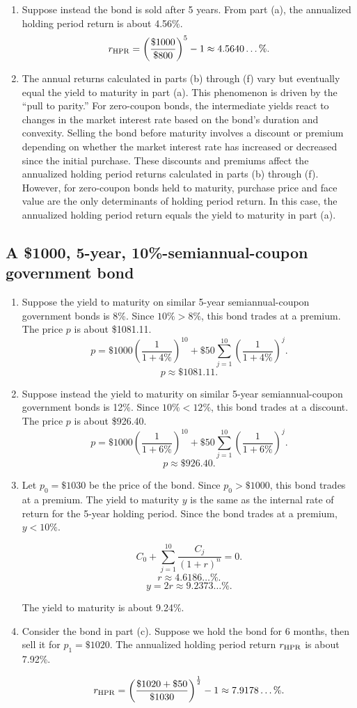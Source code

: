\documentclass[12pt]{article}
\begin{document}
\begin{enumerate}
\item Suppose instead the bond is sold after 5 years. From part (a), the annualized holding period return is about 4.56\%. \[r_{\rm HPR}=\left(\frac{\$1000}{\$800}\right)^5-1\approx 4.5640\dots\%.\]
\item The annual returns calculated in parts (b) through (f) vary but eventually equal the yield to maturity in part (a). This phenomenon is driven by the ``pull to parity.'' For zero-coupon bonds, the intermediate yields react to changes in the market interest rate based on the bond's duration and convexity. Selling the bond before maturity involves a discount or premium depending on whether the market interest rate has increased or decreased since the initial purchase. These discounts and premiums affect the annualized holding period returns calculated in parts (b) through (f). However, for zero-coupon bonds held to maturity, purchase price and face value are the only determinants of holding period return. In this case, the annualized holding period return equals the yield to maturity in part (a).
\end{enumerate}
\subsection{A \$1000, 5-year, 10\%-semiannual-coupon government bond}
\begin{enumerate}
\item Suppose the yield to maturity on similar 5-year semiannual-coupon government bonds is 8\%. Since $10\%>8\%$, this bond trades at a premium. The  price $p$ is about \$1081.11. \[p=\$1000\left(\frac{1}{1+4\%}\right)^{10}+\$50\sum_{j=1}^{10}{\left(\frac{1}{1+4\%}\right)^j}.\]
\[p\approx\$1081.11.\]
\item Suppose instead the yield to maturity on similar 5-year semiannual-coupon government bonds is 12\%. Since $10\%<12\%$, this bond trades at a discount. The price $p$ is about \$926.40. \[p=\$1000\left(\frac{1}{1+6\%}\right)^{10}+\$50\sum_{j=1}^{10}{\left(\frac{1}{1+6\%}\right)^j}.\]
\[p\approx\$926.40.\]
\item Let $p_0=\$1030$ be the price of the bond. Since $p_0>\$1000$, this bond trades at a premium. The yield to maturity $y$ is the same as the internal rate of return for the 5-year holding period. Since the bond trades at a premium, $y<10\%$.

\[C_0+\sum_{j=1}^{10}{\frac{C_j}{(1+r)^n}}=0.\]
\[r\approx 4.6186\dots\%.\]
\[y=2r\approx 9.2373\dots\%.\]

The yield to maturity is about 9.24\%.
\item Consider the bond in part (c). Suppose we hold the bond for 6 months, then sell it for $p_1=\$1020$. The annualized holding period return $r_{\rm HPR}$ is about 7.92\%.

\[r_{\rm HPR}=\left(\frac{\$1020+\$50}{\$1030}\right)^{\frac{1}{2}}-1\approx 7.9178\dots\%.\]
\end{enumerate}
\end{document}
